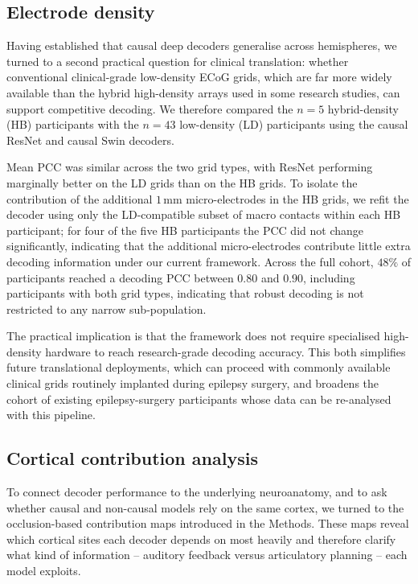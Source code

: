\documentclass[11pt]{article}
\begin{document}
\subsection{Electrode density}

Having established that causal deep decoders generalise across
hemispheres, we turned to a second practical question for clinical
translation: whether conventional clinical-grade low-density ECoG grids,
which are far more widely available than the hybrid high-density arrays
used in some research studies, can support competitive decoding. We
therefore compared the $n=5$ hybrid-density (HB) participants with the
$n=43$ low-density (LD) participants using the causal ResNet and causal
Swin decoders.

Mean PCC was similar across the two grid types, with ResNet performing
marginally better on the LD grids than on the HB grids. To isolate the
contribution of the additional $1\,\mathrm{mm}$ micro-electrodes in the
HB grids, we refit the decoder using only the LD-compatible subset of
macro contacts within each HB participant; for four of the five HB
participants the PCC did not change significantly, indicating that the
additional micro-electrodes contribute little extra decoding information
under our current framework. Across the full cohort, $48\%$ of
participants reached a decoding PCC between $0.80$ and $0.90$, including
participants with both grid types, indicating that robust decoding is not
restricted to any narrow sub-population.

The practical implication is that the framework does not require
specialised high-density hardware to reach research-grade decoding
accuracy. This both simplifies future translational deployments, which
can proceed with commonly available clinical grids routinely implanted
during epilepsy surgery, and broadens the cohort of existing
epilepsy-surgery participants whose data can be re-analysed with this
pipeline.

\subsection{Cortical contribution analysis}

To connect decoder performance to the underlying neuroanatomy, and to
ask whether causal and non-causal models rely on the same cortex, we
turned to the occlusion-based contribution maps introduced in the
Methods. These maps reveal which cortical sites each decoder depends on
most heavily and therefore clarify what kind of information -- auditory
feedback versus articulatory planning -- each model exploits.
\end{document}
